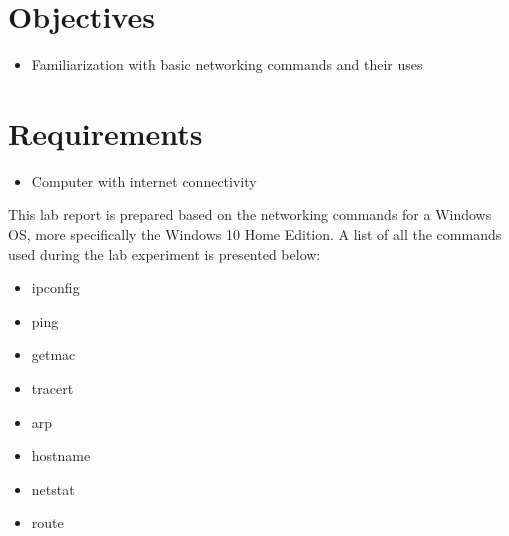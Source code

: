 \documentclass{lab_sheet}
\begin{document}
    \tableofcontents
    \pagebreak
    \lstlistoflistings
    \pagebreak
    \listoffigures
    \pagebreak
    \section{Objectives}
    \begin{itemize}
        \item Familiarization with basic networking commands and their uses
    \end{itemize}
    \section{Requirements}
    \begin{itemize}
        \item Computer with internet connectivity
    \end{itemize}
    This lab report is prepared based on the networking commands for a Windows OS, more specifically the Windows 10 Home Edition. A list of all the commands used during the lab experiment is presented below:
    \begin{itemize}
        \item ipconfig
        \item ping
        \item getmac
        \item tracert
        \item arp
        \item hostname
        \item netstat
        \item route
    \end{itemize}
\end{document}

